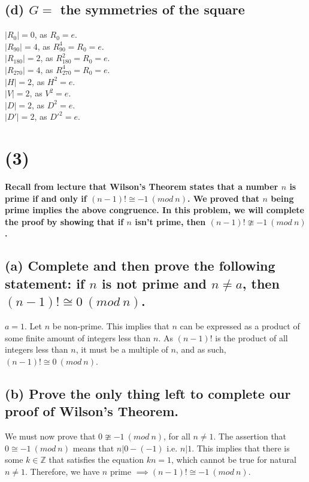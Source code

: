 \documentclass[12pt,letterpaper]{article}
\begin{document}
\subsection*{(d) \(G = \) the symmetries of the square}
\(|R_{0}| = 0\), as \(R_{0} = e\). \\
\(|R_{90}| = 4\), as \(R_{90}^{4} = R_{0} = e\). \\
\(|R_{180}| = 2\), as \(R_{180}^{2} = R_{0} = e\). \\
\(|R_{270}| = 4\), as \(R_{270}^{4} = R_{0} = e\). \\
\(|H| = 2\), as \(H^{2} = e\). \\
\(|V| = 2\), as \(V^{2} = e\). \\
\(|D| = 2\), as \(D^{2} = e\). \\
\(|D'| = 2\), as \(D'^{2} = e\). \\
\section*{(3)}
{\large \textbf{Recall from lecture that Wilson's Theorem states that a number \(n\) is prime if and only if \((n-1)! \cong -1\ (mod\ n)\). We proved that \(n\) being prime implies the above congruence. In this problem, we will complete the proof by showing that if \(n\) isn't prime, then \((n-1)! \ncong -1\ (mod\ n)\).}}

\subsection*{(a) Complete and then prove the following statement: if \(n\) is not prime and \(n \neq a\), then \((n-1)! \cong 0\ (mod\ n)\).}

\(a = 1\). Let \(n\) be non-prime. This implies that \(n\) can be expressed as a product of some finite amount of integers less than \(n\). As \((n-1)!\) is the product of all integers less than \(n\), it must be a multiple of \(n\), and as such, \((n-1)! \cong 0\ (mod\ n)\).

\subsection*{(b) Prove the only thing left to complete our proof of Wilson's Theorem.}

We must now prove that \(0 \ncong -1\ (mod\ n)\), for all \(n \neq 1\). The assertion that \(0 \cong -1\ (mod\ n)\) means that \(n | 0 - (-1)\) i.e. \(n | 1\). This implies that there is some \(k \in \mathbb{Z}\) that satisfies the equation \(kn = 1\), which cannot be true for natural \(n \neq 1\). Therefore, we have \(n\) prime \(\implies (n-1)! \cong -1\ (mod\ n)\). \\
\end{document}
